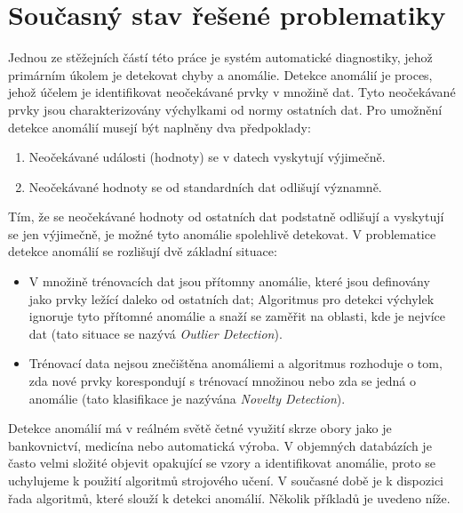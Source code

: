 \section*{Současný stav řešené problematiky} \label{sec:state_of_the_art}
Jednou ze stěžejních částí této práce je systém automatické diagnostiky, jehož primárním úkolem je detekovat chyby a anomálie. Detekce anomálií je proces, jehož účelem je identifikovat neočekávané prvky v množině dat. Tyto neočekávané prvky jsou charakterizovány výchylkami od normy ostatních dat. Pro umožnění detekce anomálií musejí být naplněny dva předpoklady: 

\begin{enumerate}
	\item Neočekávané události (hodnoty) se v datech vyskytují výjimečně.
	\item Neočekávané hodnoty se od standardních dat odlišují významně.
\end{enumerate}

Tím, že se neočekávané hodnoty od ostatních dat podstatně odlišují a vyskytují se jen výjimečně, je možné tyto anomálie spolehlivě detekovat. V problematice detekce anomálií se rozlišují dvě základní situace: 

\begin{itemize}
	\item V množině trénovacích dat jsou přítomny anomálie, které jsou definovány jako prvky ležící daleko od ostatních dat; Algoritmus pro detekci výchylek ignoruje tyto přítomné anomálie a snaží se zaměřit na oblasti, kde je nejvíce dat (tato situace se nazývá \textit{Outlier Detection}).
	\item Trénovací data nejsou znečištěna anomáliemi a algoritmus rozhoduje o tom, zda nové prvky korespondují s trénovací množinou nebo zda se jedná o anomálie (tato klasifikace je nazývána \textit{Novelty Detection}).
\end{itemize}

Detekce anomálií má v reálném světě četné využití skrze obory jako je bankovnictví, medicína nebo automatická výroba. V objemných databázích je často velmi složité objevit opakující se vzory a identifikovat anomálie, proto se uchylujeme k použití algoritmů strojového učení. V současné době je k dispozici řada algoritmů, které slouží k detekci anomálií. Několik příkladů je uvedeno níže.  \par

